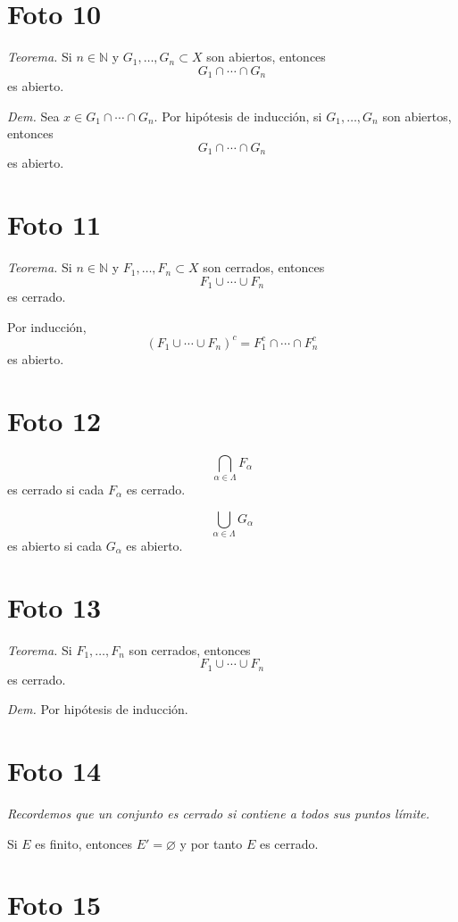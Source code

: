 \documentclass[12pt]{article}
\begin{document}
\section*{Foto 10}

\textit{Teorema.} Si $n\in\mathbb N$ y $G_1,\dots,G_n\subset X$ son abiertos, entonces
\[
G_1\cap\cdots\cap G_n
\]
es abierto.

\textit{Dem.}
Sea $x\in G_1\cap\cdots\cap G_n$.
Por hip\'otesis de inducci\'on, si $G_1,\dots,G_n$ son abiertos, entonces
\[
G_1\cap\cdots\cap G_n
\]
es abierto.

\section*{Foto 11}

\textit{Teorema.} Si $n\in\mathbb N$ y $F_1,\dots,F_n\subset X$ son cerrados, entonces
\[
F_1\cup\cdots\cup F_n
\]
es cerrado.

Por inducci\'on,
\[
(F_1\cup\cdots\cup F_n)^c=F_1^c\cap\cdots\cap F_n^c
\]
es abierto.

\section*{Foto 12}

\[
\bigcap_{\alpha\in\Lambda}F_\alpha
\]
es cerrado si cada $F_\alpha$ es cerrado.

\[
\bigcup_{\alpha\in\Lambda}G_\alpha
\]
es abierto si cada $G_\alpha$ es abierto.

\section*{Foto 13}

\textit{Teorema.}
Si $F_1,\dots,F_n$ son cerrados, entonces
\[
F_1\cup\cdots\cup F_n
\]
es cerrado.

\textit{Dem.}
Por hip\'otesis de inducci\'on.

\section*{Foto 14}

\textit{Recordemos que un conjunto es cerrado si contiene a todos sus puntos l\'imite.}

Si $E$ es finito, entonces $E'=\varnothing$ y por tanto $E$ es cerrado.

\section*{Foto 15}
\end{document}
